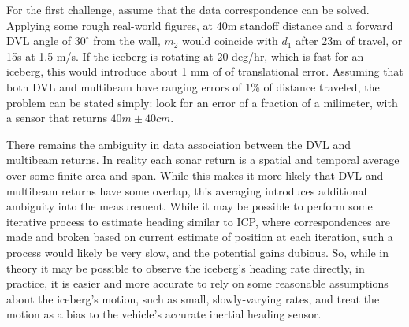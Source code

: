 For the first challenge, assume that the data correspondence can be solved. Applying some rough real-world figures, at 40m standoff distance and a forward DVL angle of $30^\circ$ from the wall, $m_2$ would coincide with $d_1$ after 23m of travel, or 15s at 1.5 m/s. If the iceberg is rotating at 20 deg/hr, which is fast for an iceberg, this would introduce about 1 mm of of translational error. Assuming that both DVL and multibeam have ranging errors of 1\% of distance traveled, the problem can be stated simply: look for an error of a fraction of a milimeter, with a sensor that returns $40m \pm 40 cm$.

There remains the ambiguity in data association between the DVL and multibeam returns. In reality each sonar return is a spatial and temporal average over some finite area and span. While this makes it more likely that DVL and multibeam returns have some overlap, this averaging introduces additional ambiguity into the measurement. While it may be possible to perform some iterative process to estimate heading similar to ICP, where correspondences are made and broken based on current estimate of position at each iteration, such a process would likely be very slow, and the potential gains dubious. So, while in theory it may be possible to observe the iceberg's heading rate directly, in practice, it is easier and more accurate to rely on some reasonable assumptions about the iceberg's motion, such as small, slowly-varying rates, and treat the motion as a bias to the vehicle's accurate inertial heading sensor.






